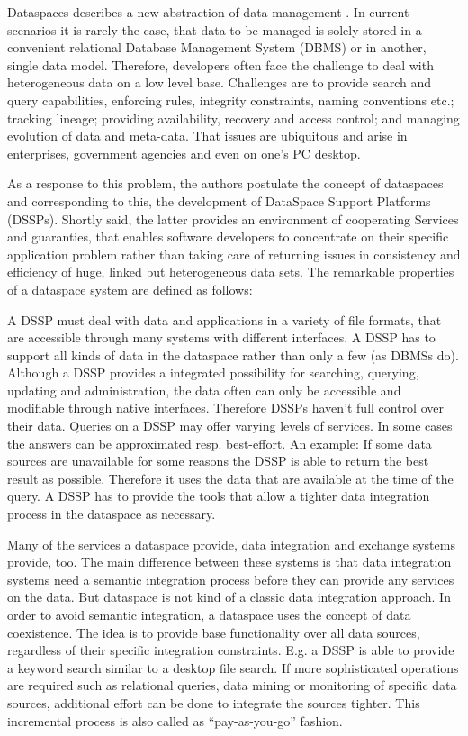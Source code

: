 Dataspaces describes a new abstraction of data management \cite{Franklin:2005:DDN:1107499.1107502}. In current scenarios it is rarely the case, that data to be managed is solely stored in a convenient relational Database Management System (DBMS) or in another, single data model. Therefore, developers often face the challenge to deal with heterogeneous data on a low level base. Challenges are to provide search and query capabilities, enforcing rules, integrity constraints, naming conventions etc.; tracking lineage; providing availability, recovery and access control; and managing evolution of data and meta-data. That issues are ubiquitous and arise in enterprises, government agencies and even on one's PC desktop. 

As a response to this problem, the authors postulate the concept of dataspaces and corresponding to this, the  development of DataSpace Support Platforms (DSSPs). Shortly said, the latter provides an environment of cooperating Services and guaranties, that enables software developers to concentrate on their specific application problem rather than taking care of returning issues in consistency and efficiency of huge, linked but heterogeneous data sets. The remarkable properties of a dataspace system are defined as follows:

A DSSP must deal with data and applications in a variety of file formats, that are accessible through many systems with different interfaces. A DSSP has to support all kinds of data in the dataspace rather than only a few (as DBMSs do).
Although a DSSP provides a integrated possibility for searching, querying, updating and administration, the data often can only be accessible and modifiable through native interfaces. Therefore DSSPs haven't full control over their data.
Queries on a DSSP may offer varying levels of services. In some cases the answers can be approximated resp. best-effort. An example: If some data sources are unavailable for some reasons the DSSP is able to return the best result as possible. Therefore it uses the data that are available at the time of the query.
A DSSP has to provide the tools that allow a tighter data integration process in the dataspace as necessary.

Many of the services a dataspace provide, data integration and exchange systems provide, too. The main difference between these systems is that data integration systems need a semantic integration process before they can provide any services on the data. But dataspace is not kind of a classic data integration approach. In order to avoid semantic integration, a dataspace uses the concept of data coexistence.  The idea is to provide base functionality over all data sources, regardless of their specific integration constraints. E.g. a DSSP is able to provide a keyword search similar to a desktop file search. If more sophisticated operations are required such as relational queries, data mining or monitoring of specific data sources, additional effort can be done to integrate the sources tighter. This incremental process is also called as ``pay-as-you-go'' fashion.

